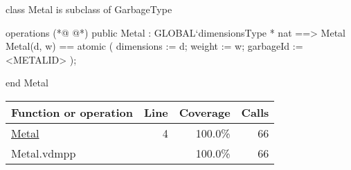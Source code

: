 \begin{vdmpp}[breaklines=true]
class Metal is subclass of GarbageType

operations
(*@
\label{Metal:4}
@*)
public Metal : GLOBAL`dimensionsType * nat ==> Metal
Metal(d, w) == 
    atomic 
    (
        dimensions := d;
        weight := w;
        garbageId := <METALID>
    );



end Metal
\end{vdmpp}
\bigskip
\begin{longtable}{|l|r|r|r|}
\hline
Function or operation & Line & Coverage & Calls \\
\hline
\hline
\hyperref[Metal:4]{Metal} & 4&100.0\% & 66 \\
\hline
\hline
Metal.vdmpp & & 100.0\% & 66 \\
\hline
\end{longtable}

